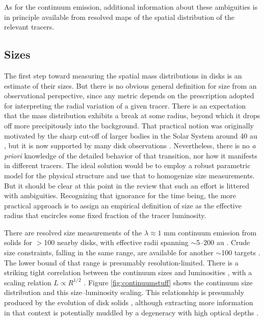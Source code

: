 \documentclass[a4paper]{ar-1col}
\begin{document}
As for the continuum emission, additional information about these ambiguities is in principle available from resolved maps of the spatial distribution of the relevant tracers.  





\subsection{Sizes} \label{sec:sizes}

The first step toward measuring the spatial mass distributions in disks is an estimate of their sizes.  But there is no obvious general definition for size from an observational perspective, since any metric depends on the prescription adopted for interpreting the radial variation of a given tracer.  There is an expectation that the mass distribution exhibits a break at some radius, beyond which it drops off more precipitously into the background.  That practical notion was originally motivated by the sharp cut-off of larger bodies in the Solar System around 40 au \citep[e.g.,][]{luu02}, but it is now supported by many disk observations \citep[e.g.,][]{andrews18}.  Nevertheless, there is no {\it a priori} knowledge of the detailed behavior of that transition, nor how it manifests in different tracers.  The ideal solution would be to employ a robust parametric model for the physical structure and use that to homogenize size measurements.  But it should be clear at this point in the review that such an effort is littered with ambiguities.  Recognizing that ignorance for the time being, the more practical approach is to assign an empirical definition of size as the effective radius that encircles some fixed fraction of the tracer luminosity. 

There are resolved size measurements of the $\lambda \approx 1$ mm continuum emission from solids for $>$100 nearby disks, with effective radii spanning $\sim$5--200 au \citep{tripathi17,tazzari17,barenfeld17_sizes,andrews18}.  Crude size constraints, falling in the same range, are available for another $\sim$100 targets \citep[e.g.,][]{eisner18,cieza19}.  The lower bound of that range is presumably resolution-limited.  There is a striking tight correlation between the continuum sizes and luminosities \citep{andrews10,pietu14}, with a scaling relation $L \propto R^{1/2}$ \citep{tripathi17,andrews18}.  Figure \ref{fig:continuumstuff} shows the continuum size distribution and this size--luminosity scaling.  This relationship is presumably produced by the evolution of disk solids \citep{tripathi17,rosotti19b}, although extracting more information in that context is potentially muddled by a degeneracy with high optical depths \citep{andrews18,zhu19}.  
\end{document}
